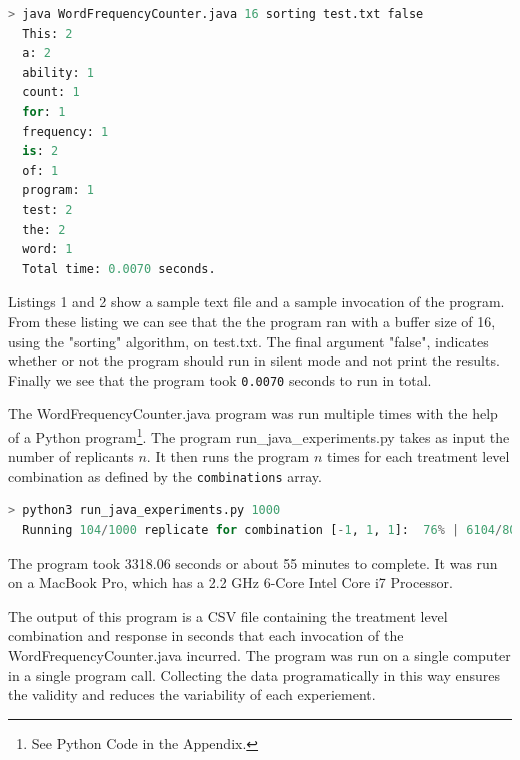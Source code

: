 \documentclass{article}
\begin{document}
\begin{lstlisting}[language=Python, 
  basicstyle=\ttfamily\scriptsize, 
  numbers=none, 
  frame=single,
  showspaces=false,
  caption={A Sample invocation of the WordFrequencyCounter.java program}]
  > java WordFrequencyCounter.java 16 sorting test.txt false
  This: 2
  a: 2
  ability: 1
  count: 1
  for: 1
  frequency: 1
  is: 2
  of: 1
  program: 1
  test: 2
  the: 2
  word: 1
  Total time: 0.0070 seconds.
\end{lstlisting}

Listings 1 and 2 show a sample text file and a sample invocation of the program.
From these listing we can see that the the program ran with a buffer size of 16,
using the "sorting" algorithm, on test.txt. The final argument "false",
indicates whether or not the program should run in silent mode and not print the results.
Finally we see that the program took \texttt{0.0070} seconds to run in total.

The WordFrequencyCounter.java program was run multiple times with the help of a Python program\footnote{See Python Code in the Appendix.}.
The program run\_java\_experiments.py takes as input the number of replicants $n$.
It then runs the program $n$ times for each treatment level combination as defined by the \texttt{combinations} array.

\begin{lstlisting}[language=Python, 
  basicstyle=\ttfamily\scriptsize, 
  numbers=none, 
  frame=single,
  showspaces=false,
  caption={A Sample invocation of the run\_java\_experiments.py program}]
  > python3 run_java_experiments.py 1000
  Running 104/1000 replicate for combination [-1, 1, 1]:  76% | 6104/8000 [1:53:37<31:00,  1.02it/s]
\end{lstlisting}

The program took 3318.06 seconds or about 55 minutes to complete. It was run on a MacBook Pro, which has a 2.2 GHz 6-Core Intel Core i7 Processor.

The output of this program is a CSV file containing the treatment level
combination and response in seconds that each invocation of the WordFrequencyCounter.java incurred.
The program was run on a single computer in a single program call.
Collecting the data programatically
in this way ensures the validity and reduces the variability of each experiement.
\end{document}
